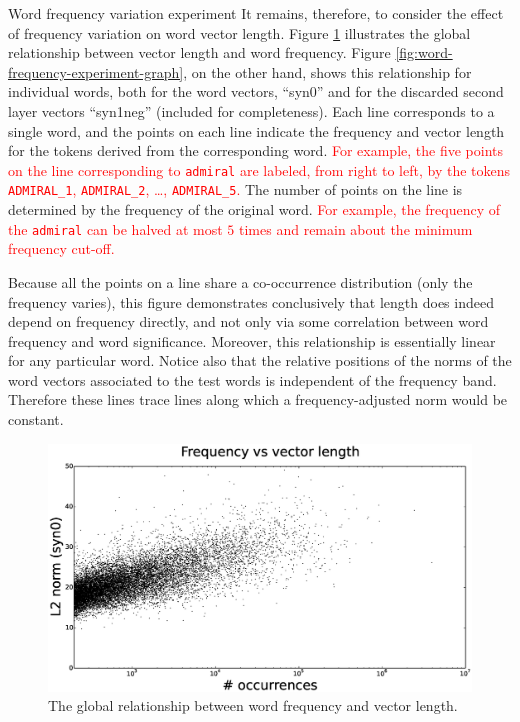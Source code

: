 \documentclass{article} %
\newcommand{\word}[1]{\texttt{#1}}
\begin{document}
\begin{section}{Word frequency variation experiment}
It remains, therefore, to consider the effect of frequency variation on word vector length.
Figure \ref{fig:frequency-norm-graph} illustrates the global relationship between vector length and word frequency.
Figure \ref{fig:word-frequency-experiment-graph}, on the other hand, shows this relationship for individual words, both for the word vectors, ``syn0'' and for the discarded second layer vectors ``syn1neg'' (included for completeness).
Each line corresponds to a single word, and the points on each line indicate the frequency and vector length for the tokens derived from the corresponding word.
\textcolor{red}{For example, the five points on the line corresponding to \word{admiral} are labeled, from right to left, by the tokens \word{ADMIRAL\_1}, \word{ADMIRAL\_2}, \dots, \word{ADMIRAL\_5}.}
The number of points on the line is determined by the frequency of the original word.
\textcolor{red}{For example, the frequency of the \word{admiral} can be halved at most $5$ times and remain about the minimum frequency cut-off.}

Because all the points on a line share a co-occurrence distribution (only the frequency varies), this figure demonstrates conclusively that length does indeed depend on frequency directly, and not only via some correlation between word frequency and word significance.
Moreover, this relationship is essentially linear for any particular word.
Notice also that the relative positions of the norms of the word vectors associated to the test words is independent of the frequency band.
Therefore these lines trace lines along which a frequency-adjusted norm would be constant.


\begin{figure}
	\includegraphics[scale=0.3]{frequency-norm-scatterplot}
	\caption{ The global relationship between word frequency and vector length.  }
	\label{fig:frequency-norm-graph}
\end{figure}


\end{section}
\end{document}
